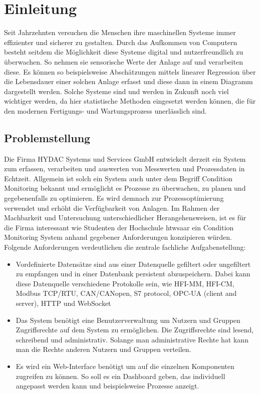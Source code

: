 \chapter{Einleitung}
\label{ch:Einleitung}
Seit Jahrzehnten versuchen die Menschen ihre maschinellen Systeme immer effizienter und sicherer zu gestalten. Durch das Aufkommen von Computern besteht seitdem die Möglichkeit diese Systeme digital und nutzerfreundlich zu überwachen. So nehmen sie sensorische Werte der Anlage auf und verarbeiten diese. Es können so beispielsweise Abschätzungen mittels linearer Regression über die Lebensdauer einer solchen Anlage erfasst und diese dann in einem Diagramm dargestellt werden. Solche Systeme sind und werden in Zukunft noch viel wichtiger werden, da hier statistische Methoden eingesetzt werden können, die für den modernen Fertigungs- und Wartungsprozess unerlässlich sind.

\section{Problemstellung}
Die Firma HYDAC Systems und Services GmbH entwickelt derzeit ein System zum erfassen, verarbeiten und auswerten von Messwerten und Prozessdaten in Echtzeit. Allgemein ist solch ein System auch unter dem Begriff Condition Monitoring bekannt und ermöglicht es Prozesse zu überwachen, zu planen und gegebenenfalls zu optimieren. Es wird demnach zur Prozessoptimierung verwendet und erhöht die Verfügbarkeit von Anlagen. Im Rahmen der Machbarkeit und Untersuchung unterschiedlicher Herangehensweisen, ist es für die Firma interessant wie Studenten der Hochschule htwsaar ein Condition Monitoring System anhand gegebener Anforderungen konzipieren würden. Folgende Anforderungen verdeutlichen die zentrale fachliche Aufgabenstellung:
\begin{itemize}
	\item Vordefinierte Datensätze sind aus einer Datenquelle gefiltert oder ungefiltert zu empfangen und in einer Datenbank persistent abzuspeichern. Dabei kann diese Datenquelle verschiedene Protokolle sein, wie HFI-MM, HFI-CM, Modbus TCP/RTU, CAN/CANopen, S7 protocol, OPC-UA (client and server), HTTP und WebSocket
	\item Das System benötigt eine Benutzerverwaltung um Nutzern und Gruppen Zugriffsrechte auf dem System zu ermöglichen. Die Zugriffsrechte sind lesend, schreibend und administrativ.  Solange man administrative Rechte hat kann man die Rechte anderen Nutzern und Gruppen verteilen.
	\item Es wird ein Web-Interface benötigt um auf die einzelnen Komponenten zugreifen zu können. So soll es ein Dashboard geben, das individuell angepasst werden kann und beispielsweise Prozesse anzeigt.
\end{itemize}


